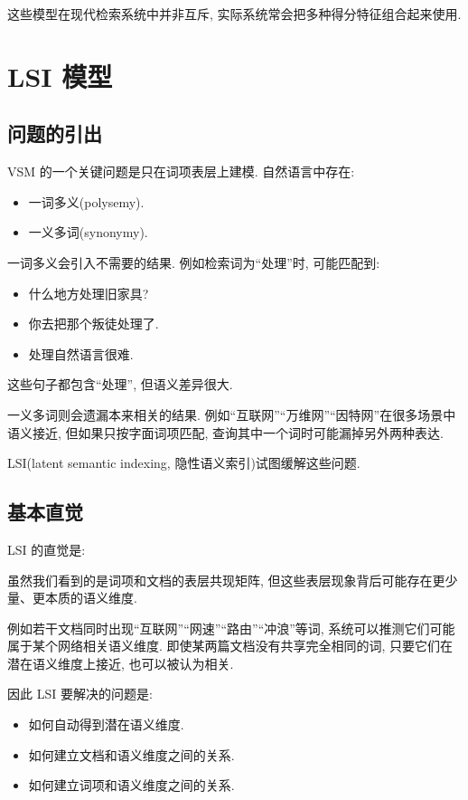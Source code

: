 这些模型在现代检索系统中并非互斥,
实际系统常会把多种得分特征组合起来使用.

\section{LSI 模型}


\subsection{问题的引出}


VSM 的一个关键问题是只在词项表层上建模.
自然语言中存在:

\begin{itemize}
\item 一词多义(polysemy).
\item 一义多词(synonymy).
\end{itemize}

一词多义会引入不需要的结果.
例如检索词为“处理”时, 可能匹配到:

\begin{itemize}
\item 什么地方处理旧家具?
\item 你去把那个叛徒处理了.
\item 处理自然语言很难.
\end{itemize}

这些句子都包含“处理”, 但语义差异很大.

一义多词则会遗漏本来相关的结果.
例如“互联网”“万维网”“因特网”在很多场景中语义接近,
但如果只按字面词项匹配, 查询其中一个词时可能漏掉另外两种表达.

LSI(latent semantic indexing, 隐性语义索引)试图缓解这些问题.

\subsection{基本直觉}


LSI 的直觉是:

虽然我们看到的是词项和文档的表层共现矩阵,
但这些表层现象背后可能存在更少量、更本质的语义维度.

例如若干文档同时出现“互联网”“网速”“路由”“冲浪”等词,
系统可以推测它们可能属于某个网络相关语义维度.
即使某两篇文档没有共享完全相同的词,
只要它们在潜在语义维度上接近, 也可以被认为相关.

因此 LSI 要解决的问题是:

\begin{itemize}
\item 如何自动得到潜在语义维度.
\item 如何建立文档和语义维度之间的关系.
\item 如何建立词项和语义维度之间的关系.
\end{itemize}

